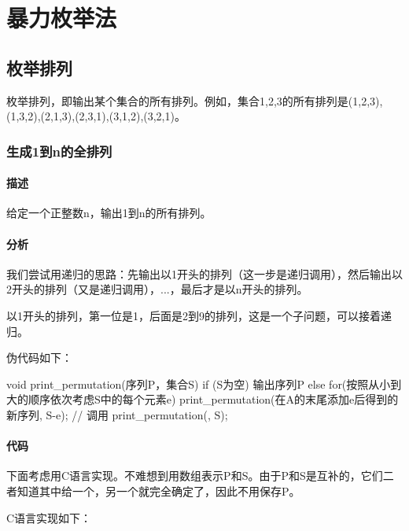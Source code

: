 \chapter{暴力枚举法}


\section{枚举排列} %
枚举排列，即输出某个集合的所有排列。例如，集合{1,2,3}的所有排列是{(1,2,3),(1,3,2),(2,1,3),(2,3,1),(3,1,2),(3,2,1)}。

\subsection{生成1到n的全排列}

\subsubsection{描述}
给定一个正整数n，输出1到n的所有排列。

\subsubsection{分析}
我们尝试用递归的思路：先输出以1开头的排列（这一步是递归调用），然后输出以2开头的排列（又是递归调用），...，最后才是以n开头的排列。

以1开头的排列，第一位是1，后面是2到9的排列，这是一个子问题，可以接着递归。

伪代码如下：
\begin{Code}
void print_permutation(序列P，集合S) {
    if (S为空) 输出序列P
    else {
        for(按照从小到大的顺序依次考虑S中的每个元素e) {
            print_permutation(在A的末尾添加e后得到的新序列, S-{e});
        }
    }
}
// 调用
print_permutation({}, S);
\end{Code}

\subsubsection{代码}
下面考虑用C语言实现。不难想到用数组表示P和S。由于P和S是互补的，它们二者知道其中给一个，另一个就完全确定了，因此不用保存P。

C语言实现如下：


